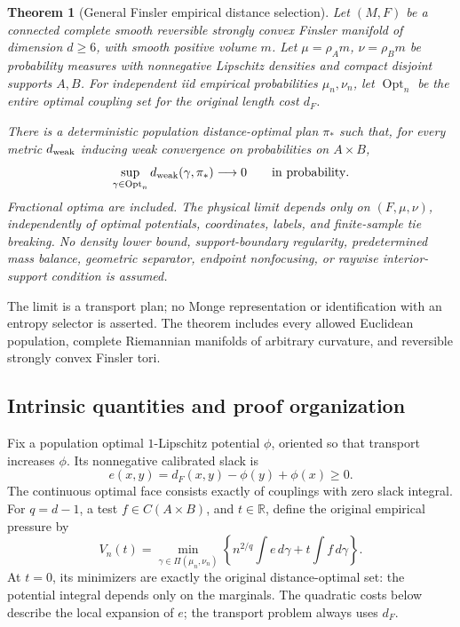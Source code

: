 \documentclass[11pt,reqno]{amsart}
\newtheorem{theorem}{Theorem}[section]
\theoremstyle{definition}
\theoremstyle{remark}
\numberwithin{equation}{section}
\newcommand{\R}{\mathbb R}
\begin{document}
\begin{theorem}[General Finsler empirical distance selection]
\label{thm:general-finsler-selector}
Let \((M,F)\) be a connected complete smooth reversible strongly
convex Finsler manifold of dimension \(d\ge6\), with smooth positive
volume \(m\). Let \(\mu=\rho_A m\), \(\nu=\rho_B m\) be probability
measures with nonnegative Lipschitz densities and compact disjoint
supports \(A,B\). For independent iid empirical probabilities
\(\mu_n,\nu_n\), let \(\operatorname{Opt}_n\) be the entire optimal
coupling set for the original length cost \(d_F\).

There is a deterministic population distance-optimal plan \(\pi_*\)
such that, for every metric \(d_{\rm weak}\) inducing weak convergence
on probabilities on \(A\times B\),
\begin{equation}
 \sup_{\gamma\in\operatorname{Opt}_n}
       d_{\rm weak}(\gamma,\pi_*)\longrightarrow0
                         \qquad\text{in probability}.
 \label{eq:general-finsler-entire-selector}
\end{equation}
Fractional optima are included. The physical limit depends only on
\((F,\mu,\nu)\), independently of optimal potentials, coordinates,
labels, and finite-sample tie breaking.
No density lower bound, support-boundary regularity, predetermined
mass balance, geometric separator, endpoint nonfocusing, or
raywise interior-support condition is assumed.
\end{theorem}

The limit is a transport plan; no Monge representation or identification
with an entropy selector is asserted. The theorem includes every allowed
Euclidean population, complete Riemannian manifolds of arbitrary curvature,
and reversible strongly convex Finsler tori.

\subsection{Intrinsic quantities and proof organization}
\label{subsec:general-proof-organization}

Fix a population optimal \(1\)-Lipschitz potential \(\phi\), oriented
so that transport increases \(\phi\). Its nonnegative calibrated slack is
\begin{equation}
 e(x,y)=d_F(x,y)-\phi(y)+\phi(x)\ge0.
 \label{eq:general-finsler-slack}
\end{equation}
The continuous optimal face consists exactly of couplings with zero
slack integral. For \(q=d-1\), a test \(f\in C(A\times B)\), and
\(t\in\R\), define the original empirical pressure by
\begin{equation}
 V_n(t)=\min_{\gamma\in\Pi(\mu_n,\nu_n)}
       \left\{n^{2/q}\int e\,d\gamma+t\int f\,d\gamma\right\}.
 \label{eq:general-finsler-pressure}
\end{equation}
At \(t=0\), its minimizers are exactly the original distance-optimal
set: the potential integral depends only on the marginals. The quadratic
costs below describe the local expansion of \(e\); the transport problem
always uses \(d_F\).
\end{document}
